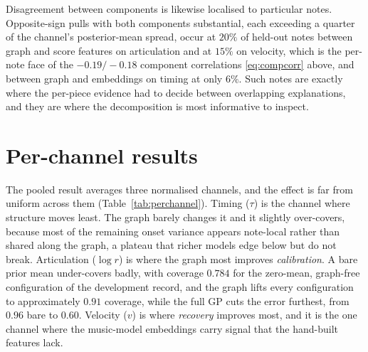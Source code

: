 Disagreement between components is likewise localised to particular notes.
Opposite-sign pulls with both components substantial, each exceeding a
quarter of the channel's posterior-mean spread, occur at $20\%$ of held-out
notes between graph and score features on articulation and at $15\%$ on
velocity, which is the per-note face of the $-0.19/-0.18$ component
correlations \eqref{eq:compcorr} above, and between graph and embeddings on
timing at only $6\%$. Such notes are exactly where the per-piece evidence had
to decide between overlapping explanations, and they are where the
decomposition is most informative to inspect.


\section{Per-channel results}\label{sec:perchannel}
The pooled result averages three normalised channels, and the effect is far
from uniform across them (Table~\ref{tab:perchannel}). Timing ($\tau$) is the
channel where structure moves least. The graph barely changes it and it
slightly over-covers, because most of the remaining onset variance appears
note-local rather than shared along the graph, a plateau that richer models
edge below but do not break. Articulation ($\log r$) is where the graph most
improves \emph{calibration}. A bare prior mean under-covers badly, with
coverage $0.784$ for the zero-mean, graph-free configuration of the
development record, and the graph lifts every configuration to approximately
$0.91$ coverage, while the full GP cuts the error furthest, from $0.96$ bare
to $0.60$. Velocity ($v$) is where \emph{recovery} improves most, and it is
the one channel where the music-model embeddings carry signal that the
hand-built features lack.

